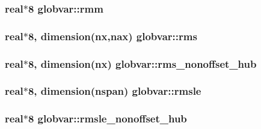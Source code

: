 \subsubsection[{rmm}]{\setlength{\rightskip}{0pt plus 5cm}real$\ast$8 globvar\+::rmm}\label{namespaceglobvar_ab216d846edeea68aa1a53f31d84b33c0}
\hypertarget{namespaceglobvar_aad49b3042db6c69206144f3ad9ea8192}{}
\subsubsection[{rms}]{\setlength{\rightskip}{0pt plus 5cm}real$\ast$8, dimension({\bf nx},{\bf nax}) globvar\+::rms}\label{namespaceglobvar_aad49b3042db6c69206144f3ad9ea8192}
\hypertarget{namespaceglobvar_a598d438487e1d0e98107a657635f77b7}{}
\subsubsection[{rms\+\_\+nonoffset\+\_\+hub}]{\setlength{\rightskip}{0pt plus 5cm}real$\ast$8, dimension({\bf nx}) globvar\+::rms\+\_\+nonoffset\+\_\+hub}\label{namespaceglobvar_a598d438487e1d0e98107a657635f77b7}
\hypertarget{namespaceglobvar_a464f621e496fe27197a4d513b4e72599}{}
\subsubsection[{rmsle}]{\setlength{\rightskip}{0pt plus 5cm}real$\ast$8, dimension({\bf nspan}) globvar\+::rmsle}\label{namespaceglobvar_a464f621e496fe27197a4d513b4e72599}
\hypertarget{namespaceglobvar_a5237bcbafe8fc6ccd929edfff7448b15}{}
\subsubsection[{rmsle\+\_\+nonoffset\+\_\+hub}]{\setlength{\rightskip}{0pt plus 5cm}real$\ast$8 globvar\+::rmsle\+\_\+nonoffset\+\_\+hub}\label{namespaceglobvar_a5237bcbafe8fc6ccd929edfff7448b15}
\hypertarget{namespaceglobvar_a74bf48252c7df2668280317e7f2054de}{}
